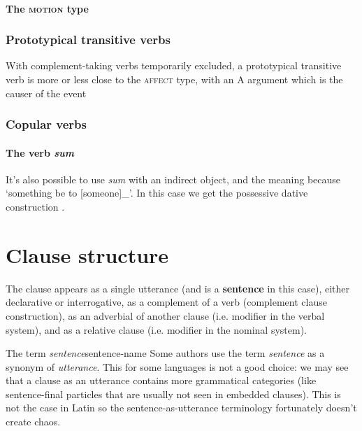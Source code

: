 \documentclass[a4paper, oneside]{report}
\newcommand*{\citesec}[1]{\S~{#1}}
\newcommand*{\concept}[1]{\textbf{#1}}
\newcommand*{\term}[1]{\emph{#1}}
\newcommand{\form}[1]{\emph{#1}}
\newcommand{\translate}[1]{`#1'}
\newcommand{\classify}[1]{{\textsc{#1}}}
\begin{document}
\subsubsection{The \classify{motion} type}


\subsection{Prototypical transitive verbs}\label{sec:prototypical-transitive}

With complement-taking verbs temporarily excluded,
a prototypical transitive verb is more or less close to the \classify{affect} type,
with an A argument which is the causer of the event 

\subsection{Copular verbs}

\subsubsection{The verb \form{sum}}\label{sec:sum}

It's also possible to use \form{sum} with an indirect object, 
and the meaning because \translate{something be to [someone]_{}}.
In this case we get the possessive dative construction
\citep[\citesec{373}]{allen1903allen}.

\chapter{Clause structure}

The clause appears as a single utterance 
(and is a \concept{sentence} in this case),
either declarative or interrogative,
as a complement of a verb (complement clause construction),
as an adverbial of another clause
(i.e. modifier in the verbal system),
and as a relative clause 
(i.e. modifier in the nominal system).


\begin{infobox}{The term \term{sentence}}{sentence-name}
    Some authors use the term \term{sentence}
    as a synonym of \term{utterance}.
    This for some languages is not a good choice: 
    we may see that a clause as an utterance 
    contains more grammatical categories 
    (like sentence-final particles that are usually not seen in embedded clauses).
    This is not the case in Latin
    so the sentence-as-utterance terminology fortunately 
    doesn't create chaos.
\end{infobox}
\end{document}
